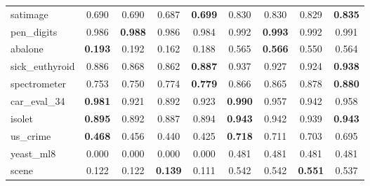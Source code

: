 \begin{figure}[ht]
\begin{tabular}{p{22mm}|*4{p{14mm}}|*4{p{14mm}}}
        satimage&\multicolumn{1}{c}{0.690}&\multicolumn{1}{c}{0.690}&\multicolumn{1}{c}{0.687}&\multicolumn{1}{c|}{\textbf{0.699}}&\multicolumn{1}{c}{0.830}&\multicolumn{1}{c}{0.830}&\multicolumn{1}{c}{0.829}&\multicolumn{1}{c}{\textbf{0.835}}\\
        pen\_digits&\multicolumn{1}{c}{0.986}&\multicolumn{1}{c}{\textbf{0.988}}&\multicolumn{1}{c}{0.986}&\multicolumn{1}{c|}{0.984}&\multicolumn{1}{c}{0.992}&\multicolumn{1}{c}{\textbf{0.993}}&\multicolumn{1}{c}{0.992}&\multicolumn{1}{c}{0.991}\\
        abalone&\multicolumn{1}{c}{\textbf{0.193}}&\multicolumn{1}{c}{0.192}&\multicolumn{1}{c}{0.162}&\multicolumn{1}{c|}{0.188}&\multicolumn{1}{c}{0.565}&\multicolumn{1}{c}{\textbf{0.566}}&\multicolumn{1}{c}{0.550}&\multicolumn{1}{c}{0.564}\\
        sick\_euthyroid&\multicolumn{1}{c}{0.886}&\multicolumn{1}{c}{0.868}&\multicolumn{1}{c}{0.862}&\multicolumn{1}{c|}{\textbf{0.887}}&\multicolumn{1}{c}{0.937}&\multicolumn{1}{c}{0.927}&\multicolumn{1}{c}{0.924}&\multicolumn{1}{c}{\textbf{0.938}}\\
        spectrometer&\multicolumn{1}{c}{0.753}&\multicolumn{1}{c}{0.750}&\multicolumn{1}{c}{0.774}&\multicolumn{1}{c|}{\textbf{0.779}}&\multicolumn{1}{c}{0.866}&\multicolumn{1}{c}{0.865}&\multicolumn{1}{c}{0.878}&\multicolumn{1}{c}{\textbf{0.880}}\\
        car\_eval\_34&\multicolumn{1}{c}{\textbf{0.981}}&\multicolumn{1}{c}{0.921}&\multicolumn{1}{c}{0.892}&\multicolumn{1}{c|}{0.923}&\multicolumn{1}{c}{\textbf{0.990}}&\multicolumn{1}{c}{0.957}&\multicolumn{1}{c}{0.942}&\multicolumn{1}{c}{0.958}\\
        isolet&\multicolumn{1}{c}{\textbf{0.895}}&\multicolumn{1}{c}{0.892}&\multicolumn{1}{c}{0.887}&\multicolumn{1}{c|}{0.894}&\multicolumn{1}{c}{\textbf{0.943}}&\multicolumn{1}{c}{0.942}&\multicolumn{1}{c}{0.939}&\multicolumn{1}{c}{\textbf{0.943}}\\
        us\_crime&\multicolumn{1}{c}{\textbf{0.468}}&\multicolumn{1}{c}{0.456}&\multicolumn{1}{c}{0.440}&\multicolumn{1}{c|}{0.425}&\multicolumn{1}{c}{\textbf{0.718}}&\multicolumn{1}{c}{0.711}&\multicolumn{1}{c}{0.703}&\multicolumn{1}{c}{0.695}\\
        yeast\_ml8&\multicolumn{1}{c}{0.000}&\multicolumn{1}{c}{0.000}&\multicolumn{1}{c}{0.000}&\multicolumn{1}{c|}{0.000}&\multicolumn{1}{c}{0.481}&\multicolumn{1}{c}{0.481}&\multicolumn{1}{c}{0.481}&\multicolumn{1}{c}{0.481}\\
        scene&\multicolumn{1}{c}{0.122}&\multicolumn{1}{c}{0.122}&\multicolumn{1}{c}{\textbf{0.139}}&\multicolumn{1}{c|}{0.111}&\multicolumn{1}{c}{0.542}&\multicolumn{1}{c}{0.542}&\multicolumn{1}{c}{\textbf{0.551}}&\multicolumn{1}{c}{0.537}\\

\end{tabular}
\end{figure}
